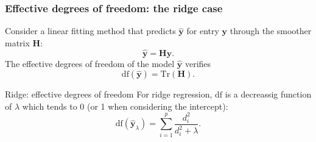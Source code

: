 \documentclass{beamer}\usepackage[]{graphicx}\usepackage[]{color}
\begin{document}
\begin{frame}
  \frametitle{Effective degrees of freedom: the ridge case}

  \begin{proposition} Consider a linear fitting method that predicts
    $\hat{\mathbf{y}}$  for  entry  $\mathbf{y}$  through  the
    smoother matrix $\mathbf{H}$:
    \begin{equation*}
      \hat{\mathbf{y}} = \mathbf{H} \mathbf{y}.
    \end{equation*}
    The    effective    degrees    of    freedom    of    the    model
    $\hat{\mathbf{y}}$ verifies
    \begin{equation*}
      \mathrm{df}(\hat{\mathbf{y}}) = \mathrm{Tr}(\mathbf{H}).
    \end{equation*}
  \end{proposition}

  \vfill

  \begin{block}{Ridge: effective degrees of freedom}
    For ridge  regression, $\mathrm{df}$  is a decreassig  function of
    $\lambda$ which tends to 0 (or 1 when considering the intercept):
    \begin{equation*}
      \mathrm{df}(\hat{\mathbf{y}}_\lambda) =\sum_{i=1}^p \frac{d_i^2}{d_i^2+\lambda}.
    \end{equation*}
  \end{block}


\end{frame}
 
\end{document}
